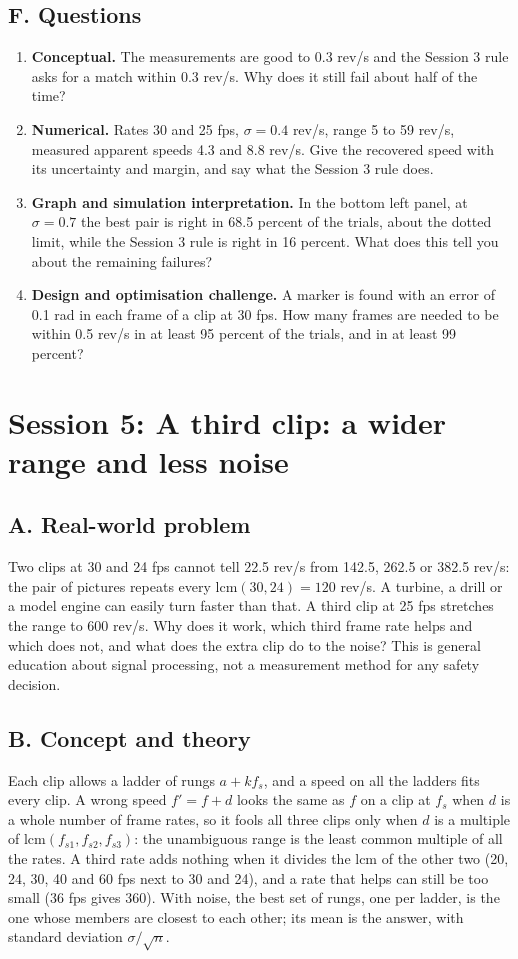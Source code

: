 \documentclass[11pt,a4paper]{article}
\begin{document}
\subsection*{F. Questions}
\begin{enumerate}[nosep]
\item \textbf{Conceptual.} The measurements are good to 0.3 rev/s and the Session 3 rule asks for a match within 0.3 rev/s. Why does it still fail about half of the time?
\item \textbf{Numerical.} Rates 30 and 25 fps, $\sigma=0.4$ rev/s, range 5 to 59 rev/s, measured apparent speeds 4.3 and 8.8 rev/s. Give the recovered speed with its uncertainty and margin, and say what the Session 3 rule does.
\item \textbf{Graph and simulation interpretation.} In the bottom left panel, at $\sigma=0.7$ the best pair is right in 68.5 percent of the trials, about the dotted limit, while the Session 3 rule is right in 16 percent. What does this tell you about the remaining failures?
\item \textbf{Design and optimisation challenge.} A marker is found with an error of 0.1 rad in each frame of a clip at 30 fps. How many frames are needed to be within 0.5 rev/s in at least 95 percent of the trials, and in at least 99 percent?
\end{enumerate}

\section{Session 5: A third clip: a wider range and less noise}

\subsection*{A. Real-world problem}
Two clips at 30 and 24 fps cannot tell 22.5 rev/s from 142.5, 262.5 or 382.5 rev/s: the pair of pictures repeats every $\mathrm{lcm}(30,24)=120$ rev/s. A turbine, a drill or a model engine can easily turn faster than that. A third clip at 25 fps stretches the range to 600 rev/s. Why does it work, which third frame rate helps and which does not, and what does the extra clip do to the noise? This is general education about signal processing, not a measurement method for any safety decision.

\subsection*{B. Concept and theory}
Each clip allows a ladder of rungs $a+kf_s$, and a speed on all the ladders fits every clip. A wrong speed $f'=f+d$ looks the same as $f$ on a clip at $f_s$ when $d$ is a whole number of frame rates, so it fools all three clips only when $d$ is a multiple of $\mathrm{lcm}(f_{s1},f_{s2},f_{s3})$: the unambiguous range is the least common multiple of all the rates. A third rate adds nothing when it divides the lcm of the other two (20, 24, 30, 40 and 60 fps next to 30 and 24), and a rate that helps can still be too small (36 fps gives 360). With noise, the best set of rungs, one per ladder, is the one whose members are closest to each other; its mean is the answer, with standard deviation $\sigma/\sqrt n$.
\end{document}
